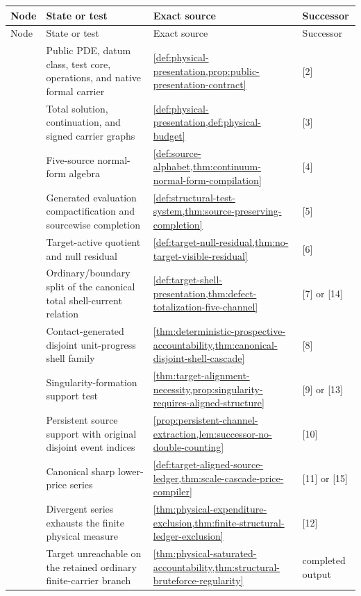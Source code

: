\documentclass[11pt]{article}
\numberwithin{section}{part}
\theoremstyle{plain}
\theoremstyle{definition}
\theoremstyle{remark}
\begin{document}
\begin{longtable}{p{.055\linewidth}p{.28\linewidth}p{.42\linewidth}p{.12\linewidth}}
\toprule
Node & State or test & Exact source & Successor\\
\midrule
\endfirsthead
\toprule
Node & State or test & Exact source & Successor\\
\midrule
\endhead
\relax
[1] & Public PDE, datum class, test core, operations, and native formal carrier &
\cref{def:physical-presentation,prop:public-presentation-contract} & [2]\\
\relax
[2] & Total solution, continuation, and signed carrier graphs &
\cref{def:physical-presentation,def:physical-budget} & [3]\\
\relax
[3] & Five-source normal-form algebra &
\cref{def:source-alphabet,thm:continuum-normal-form-compilation} & [4]\\
\relax
[4] & Generated evaluation compactification and sourcewise completion &
\cref{def:structural-test-system,thm:source-preserving-completion} & [5]\\
\relax
[5] & Target-active quotient and null residual &
\cref{def:target-null-residual,thm:no-target-visible-residual} & [6]\\
\relax
[6] & Ordinary/boundary split of the canonical total shell-current relation &
\cref{def:target-shell-presentation,thm:defect-totalization-five-channel} & [7] or [14]\\
\relax
[7] & Contact-generated disjoint unit-progress shell family &
\cref{thm:deterministic-prospective-accountability,thm:canonical-disjoint-shell-cascade} & [8]\\
\relax
[8] & Singularity-formation support test &
\cref{thm:target-alignment-necessity,prop:singularity-requires-aligned-structure} & [9] or [13]\\
\relax
[9] & Persistent source support with original disjoint event indices &
\cref{prop:persistent-channel-extraction,lem:successor-no-double-counting} & [10]\\
\relax
[10] & Canonical sharp lower-price series &
\cref{def:target-aligned-source-ledger,thm:scale-cascade-price-compiler} & [11] or [15]\\
\relax
[11] & Divergent series exhausts the finite physical measure &
\cref{thm:physical-expenditure-exclusion,thm:finite-structural-ledger-exclusion} & [12]\\
\relax
[12] & Target unreachable on the retained ordinary finite-carrier branch &
\cref{thm:physical-saturated-accountability,thm:structural-bruteforce-regularity} & completed output\\

\end{longtable}
\end{document}
